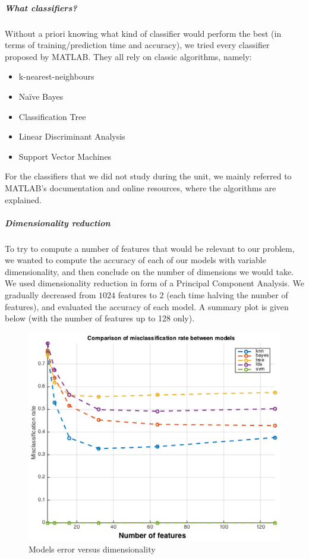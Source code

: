 \documentclass[twocolumn]{article}%
\begin{document}
	\subparagraph{What classifiers?}
	Without a priori knowing what kind of classifier would perform the best (in terms of training/prediction time and accuracy), we tried every classifier proposed by MATLAB. They all rely on classic algorithms, namely:
	\begin{itemize}
	\item k-nearest-neighbours
	\item Naïve Bayes
	\item Classification Tree
	\item Linear Discriminant Analysis
	\item Support Vector Machines
	\end{itemize}
	
	For the classifiers that we did not study during the unit, we mainly referred to MATLAB's documentation and online resources, where the algorithms are explained.
	
	\subparagraph{Dimensionality reduction}
	To try to compute a number of features that would be relevant to our problem, we wanted to compute the accuracy of each of our models with variable dimensionality, and then conclude on the number of dimensions we would take.
	We used dimensionality reduction in form of a Principal Component Analysis. We gradually decreased from $1024$ features to $2$ (each time halving the number of features), and evaluated the accuracy of each model. A summary plot is given below (with the number of features up to 128 only).
	
	\begin{figure}[htp]
	\centering
	\includegraphics[scale=0.45]{images/error_vs_dimension.png}
	\caption{Models error versus dimensionality}
	\end{figure}
	
\end{document}
